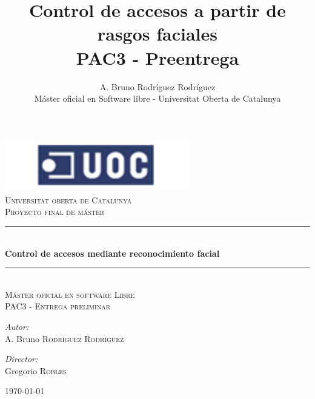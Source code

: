 \documentclass[a4paper]{book}
\newcommand{\HRule}{\rule{\linewidth}{0.5mm}}
\begin{document}
\frontmatter
\title {Control de accesos a partir de rasgos faciales \\ \Large{PAC3 - Preentrega} }
\author {A. Bruno Rodríguez Rodríguez \\ \normalsize{Máster oficial en Software libre - Universitat Oberta de Catalunya}}
\date{}

\begin{titlepage}
\begin{center}
	\includegraphics[width=8cm]{uoc.png}\\[1.5cm]
 
	\textsc{\LARGE Universitat oberta de Catalunya}\\[2cm]

	\textsc{\Huge Proyecto final de máster}\\[1cm]

	\HRule \\[1cm]
	{ \LARGE \bfseries Control de accesos mediante reconocimiento facial}\\[1cm]
	\HRule \\[2cm]

	\textsc{\Large Máster oficial en software Libre}\\[1cm]

	\textsc{\Large PAC3 - Entrega preliminar}\\[4cm]
 
	\begin{minipage}{0.4\textwidth}
	\begin{flushleft} \large
	\emph{Autor:}\\
	A. Bruno \textsc{Rodríguez Rodríguez}
	\end{flushleft}
	\end{minipage}
	\begin{minipage}{0.4\textwidth}
	\begin{flushright} \large
	\emph{Director:} \\
	Gregorio \textsc{Robles}
	\end{flushright}
	\end{minipage}

	\vfill
 
	{\large \today}
 
\end{center}
\end{titlepage}
\end{document}
